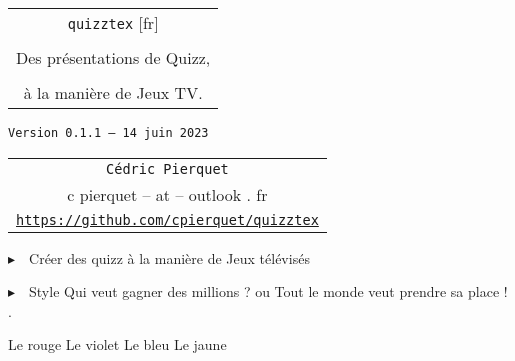 \documentclass[french,a4paper,11pt]{article}
\def\TPversion{0.1.1}
\def\TPdate{14 juin 2023}
\begin{document}
\setlength{\aweboxleftmargin}{0.07\linewidth}
\setlength{\aweboxcontentwidth}{0.93\linewidth}
\setlength{\aweboxvskip}{8pt}

\pagestyle{fancy}

\thispagestyle{empty}

\vspace{2cm}

\begin{center}
	\begin{minipage}{0.75\linewidth}
	\begin{tcolorbox}[colframe=yellow,colback=yellow!15]
		\begin{center}
			\begin{tabular}{c}
				{\Huge \texttt{quizztex} [fr]}\\
				\\
				{\LARGE Des présentations de Quizz,} \\
				\\
				{\LARGE à la manière de Jeux TV.} \\
			\end{tabular}
			
			\bigskip
			
			{\small \texttt{Version \TPversion{} -- \TPdate}}
		\end{center}
	\end{tcolorbox}
\end{minipage}
\end{center}

\begin{center}
	\begin{tabular}{c}
	\texttt{Cédric Pierquet}\\
	{\ttfamily c pierquet -- at -- outlook . fr}\\
	\texttt{\url{https://github.com/cpierquet/quizztex}}
\end{tabular}
\end{center}

\vspace{0.25cm}

{$\blacktriangleright$~~Créer des quizz à la manière de Jeux télévisés}

\vspace{0.25cm}

{$\blacktriangleright$~~Style \og Qui veut gagner des millions ? \fg{} ou \og Tout le monde veut prendre sa place ! \fg{}.}

\vspace{1cm}

\hfill{}
{Le rouge} {Le violet}
{Le bleu} {Le jaune}\hfill~
\end{document}
